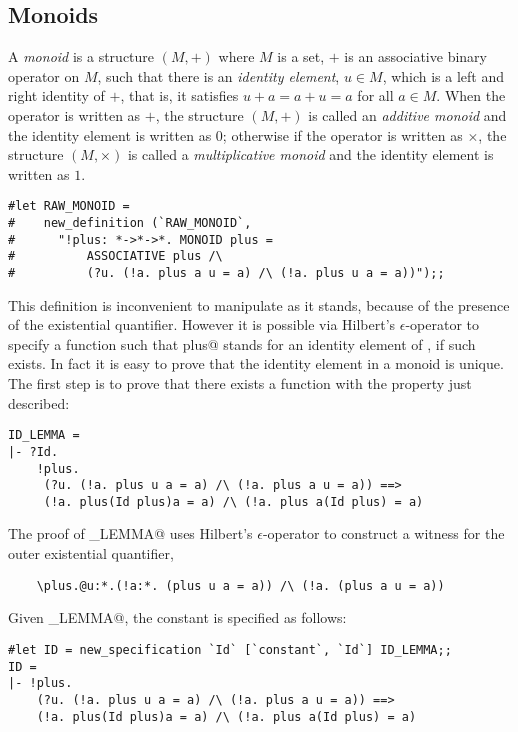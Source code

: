 \subsection{Monoids}

A {\em monoid} is a structure $(M,+)$ where $M$ is a set, $+$ is an 
associative binary operator on $M$, such that there is an {\em identity 
element}, $u \in M$, which is a left and right identity of $+$, that is, 
it satisfies $u+a = a+u = a$ for all $a \in M$. When the operator is written 
as $+$, the structure $(M,+)$ is called an {\em additive monoid} and the 
identity element is written as $0$; otherwise if the operator is written 
as $\times$, the structure $(M,\times)$ is called a {\em multiplicative 
monoid} and the identity element is written as $1$.
\begin{session}
\begin{verbatim}
#let RAW_MONOID =
#    new_definition (`RAW_MONOID`,
#      "!plus: *->*->*. MONOID plus =
#          ASSOCIATIVE plus /\
#          (?u. (!a. plus a u = a) /\ (!a. plus u a = a))");;
\end{verbatim}
\end{session}
This definition is inconvenient to manipulate as it stands, because of 
the presence of the existential quantifier.  However it is possible via 
Hilbert's $\epsilon$-operator to specify a function \verb@Id@ such that 
\verb@Id plus@ stands for an identity element of \verb@plus@, if such 
exists.  In fact it is easy to prove that the identity element in a monoid 
is unique.  The first step is to prove that there exists a function \verb@Id@ 
with the property just described:
\begin{session}
\begin{verbatim}
ID_LEMMA = 
|- ?Id.
    !plus.
     (?u. (!a. plus u a = a) /\ (!a. plus a u = a)) ==>
     (!a. plus(Id plus)a = a) /\ (!a. plus a(Id plus) = a)
\end{verbatim}
\end{session}
The proof of \verb@ID_LEMMA@ uses Hilbert's $\epsilon$-operator to
construct a witness for the outer existential quantifier,
\begin{verbatim}
    \plus.@u:*.(!a:*. (plus u a = a)) /\ (!a. (plus a u = a))
\end{verbatim}
Given \verb@ID_LEMMA@, the constant \verb@Id@ is specified as follows:
\begin{session}
\begin{verbatim}
#let ID = new_specification `Id` [`constant`, `Id`] ID_LEMMA;;
ID = 
|- !plus.
    (?u. (!a. plus u a = a) /\ (!a. plus a u = a)) ==>
    (!a. plus(Id plus)a = a) /\ (!a. plus a(Id plus) = a)
\end{verbatim}
\end{session}
